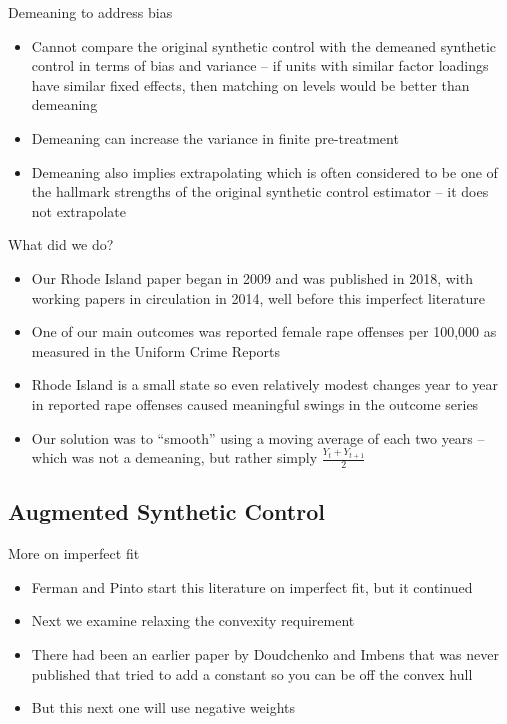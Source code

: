 \documentclass{beamer}
\begin{document}
\begin{frame}{Demeaning to address bias}

\begin{itemize}

\item Cannot compare the original synthetic control with the demeaned synthetic control in terms of bias and variance -- if units with similar factor loadings have similar fixed effects, then matching on levels would be better than demeaning 
\item Demeaning can increase the variance in finite pre-treatment
\item Demeaning also implies extrapolating which is often considered to be one of the hallmark strengths of the original synthetic control estimator -- it does not extrapolate 

\end{itemize}

\end{frame}

\begin{frame}{What did we do?}

\begin{itemize}
\item Our Rhode Island paper began in 2009 and was published in 2018, with working papers in circulation in 2014, well before this imperfect literature
\item One of our main outcomes was reported female rape offenses per 100,000 as measured in the Uniform Crime Reports 
\item Rhode Island is a small state so even relatively modest changes year to year in reported rape offenses caused meaningful swings in the outcome series
\item Our solution was to ``smooth'' using a moving average of each two years -- which was not a demeaning, but rather simply $\frac{Y_t + Y_{t+1}}{2}$
\end{itemize}

\end{frame}





\subsection{Augmented Synthetic Control}

\begin{frame}{More on imperfect fit}

\begin{itemize}
\item Ferman and Pinto start this literature on imperfect fit, but it continued
\item Next we examine relaxing the convexity requirement
\item There had been an earlier paper by Doudchenko and Imbens that was never published that tried to add a constant so you can be off the convex hull
\item But this next one will use negative weights
\end{itemize}

\end{frame}
\end{document}
